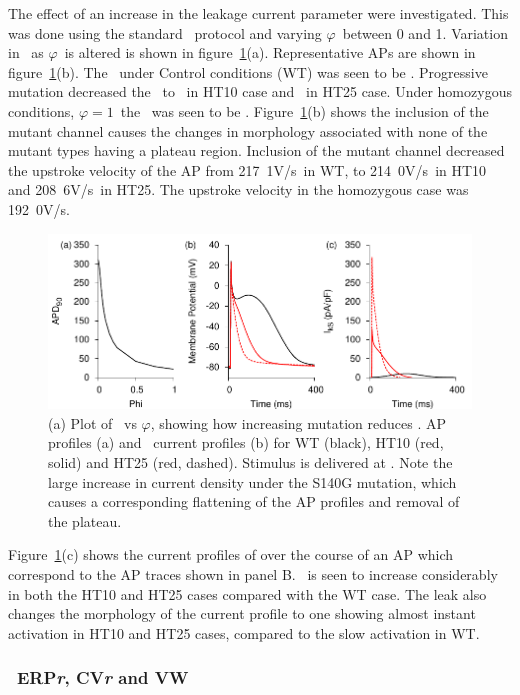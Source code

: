 The effect of an increase in the leakage current parameter were investigated.
This was done using the standard \apd\ protocol and varying $\varphi$\ between
0 and 1.
Variation in \apd\ as $\varphi$\ is altered is shown in
figure~\ref{atrium:iks:apd}(a).
Representative APs are shown in figure~\ref{atrium:iks:apd}(b).
The \apd\ under Control conditions (WT) was seen to be .
Progressive mutation decreased the \apd\ to \ in HT10 case and
\ in HT25 case.
Under homozygous conditions, $\varphi = 1$\, the \apd\ was seen to be .
Figure~\ref{atrium:iks:apd}(b) shows the inclusion of the mutant channel causes
the changes in morphology associated with none of the mutant types having a
plateau region.
Inclusion of the mutant channel decreased the upstroke velocity of the AP from
\unit{217.1}{V/s}\ in WT, to \unit{214.0}{V/s}\ in HT10 and \unit{208.6}{V/s}\
in HT25.
The upstroke velocity in the homozygous case was \unit{192.0}{V/s}.
\begin{figure}
\includegraphics{figures/atrium/iks/figures/02_APD}
\caption[AP and current profiles with S140G mutation]{
\label{atrium:iks:apd}
(a) Plot of \apd\ vs $\varphi$, showing how increasing mutation reduces \apd.
AP profiles (a) and \ii{Ks}\ current profiles (b) for WT (black), HT10 (red,
solid) and HT25 (red, dashed).
Stimulus is delivered at .
Note the large increase in current density under the S140G mutation, which
causes a corresponding flattening of the AP profiles and removal of the plateau.
}
\end{figure}
Figure~\ref{atrium:iks:apd}(c) shows the current profiles of  over the course of
an AP which correspond to the AP traces shown in panel B.
\ii{Ks}\ is seen to increase considerably in both the HT10 and HT25 cases
compared with the WT case.
The leak also changes the morphology of the current profile to one showing
almost instant activation in HT10 and HT25 cases, compared to the slow
activation in WT.

\subsubsection{\apdr\, ERP\emph{r}, CV\emph{r} and VW}

